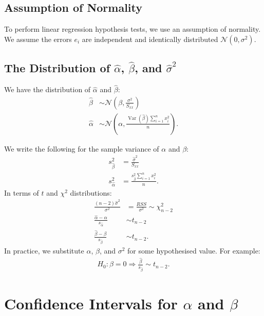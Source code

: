 \documentclass[a4paper, 12pt, twoside]{article}
\DeclareMathOperator{\Var}{Var}
\begin{document}
\subsection{Assumption of Normality}

To perform linear regression hypothesis tests, we use an assumption
of normality. We assume the errors $e_i$ are independent and
identically distributed $\mathcal{N}(0, \sigma^2)$.

\subsection{The Distribution of $\hat\alpha$,
    $\hat\beta$, and $\hat\sigma^2$}

We have the distribution of $\hat\alpha$ and
$\hat\beta$:
\begin{align*}
    \hat\beta  & \sim \mathcal{N}\left(\beta,
    \frac{\sigma^2}{S_{xx}}\right)             \\
    \hat\alpha & \sim \mathcal{N}\left(\alpha,
    \frac{\Var(\hat\beta) \sum_{i = 1}^n x_i^2}{n}\right).
\end{align*}

\newpage

We write the following for the sample variance of $\alpha$ and $\beta$:
\begin{align*}
    s_{\hat\beta}^2  & = \frac{\hat\sigma^2}{S_{xx}}                   \\
    s_{\hat\alpha}^2 & = \frac{s_{\hat\beta}^2 \sum_{i=1}^n x_i^2}{n}.
\end{align*}
In terms of $t$ and $\chi^2$ distributions:
\begin{align*}
    \frac{(n - 2)\hat\sigma^2}{\sigma^2}       & = \frac{RSS}{\sigma^2}
    \sim \chi^2_{n - 2}                                                 \\
    \frac{\hat\alpha - \alpha}{s_{\hat\alpha}} & \sim t_{n - 2}         \\
    \frac{\hat\beta - \beta}{s_{\hat\beta}}    & \sim t_{n - 2}.
\end{align*}
In practice, we substitute $\alpha$, $\beta$, and $\sigma^2$ for
some hypothesised value. For example:
\begin{align*}
    H_0 : \beta = 0 \Rightarrow
    \frac{\hat\beta}{s_{\hat\beta}} \sim t_{n - 2}.
\end{align*}

\section{Confidence Intervals for $\alpha$ and $\beta$}
\end{document}
